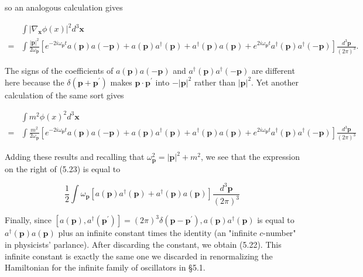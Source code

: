 \documentclass[10pt, letterpaper]{article}
\begin{document}
so an analogous calculation gives

$$
\begin{aligned}
& \int\left|\nabla_{\mathbf{x}} \phi(x)\right|^{2} d^{3} \mathbf{x} \\
= & \int \frac{|\mathbf{p}|^{2}}{2 \omega_{\mathbf{p}}}\left[e^{-2 i \omega_{\mathbf{p}} t} a(\mathbf{p}) a(-\mathbf{p})+a(\mathbf{p}) a^{\dagger}(\mathbf{p})+a^{\dagger}(\mathbf{p}) a(\mathbf{p})+e^{2 i \omega_{\mathbf{p}} t} a^{\dagger}(\mathbf{p}) a^{\dagger}(-\mathbf{p})\right] \frac{d^{3} \mathbf{p}}{(2 \pi)^{3}} .
\end{aligned}
$$

The signs of the coefficients of $a(\mathbf{p}) a(-\mathbf{p})$ and $a^{\dagger}(\mathbf{p}) a^{\dagger}(-\mathbf{p})$ are different here because the $\delta\left(\mathbf{p}+\mathbf{p}^{\prime}\right)$ makes $\mathbf{p} \cdot \mathbf{p}^{\prime}$ into $-|\mathbf{p}|^{2}$ rather than $|\mathbf{p}|^{2}$. Yet another calculation of the same sort gives

$$
\begin{aligned}
& \int m^{2} \phi(x)^{2} d^{3} \mathbf{x} \\
= & \int \frac{m^{2}}{2 \omega_{\mathbf{p}}}\left[e^{-2 i \omega_{\mathbf{p}} t} a(\mathbf{p}) a(-\mathbf{p})+a(\mathbf{p}) a^{\dagger}(\mathbf{p})+a^{\dagger}(\mathbf{p}) a(\mathbf{p})+e^{2 i \omega_{\mathbf{p}} t} a^{\dagger}(\mathbf{p}) a^{\dagger}(-\mathbf{p})\right] \frac{d^{3} \mathbf{p}}{(2 \pi)^{3}}
\end{aligned}
$$

Adding these results and recalling that $\omega_{\mathbf{p}}^{2}=|\mathbf{p}|^{2}+m^{2}$, we see that the expression on the right of (5.23) is equal to

$$
\frac{1}{2} \int \omega_{\mathbf{p}}\left[a(\mathbf{p}) a^{\dagger}(\mathbf{p})+a^{\dagger}(\mathbf{p}) a(\mathbf{p})\right] \frac{d^{3} \mathbf{p}}{(2 \pi)^{3}}
$$

Finally, since $\left[a(\mathbf{p}), a^{\dagger}\left(\mathbf{p}^{\prime}\right)\right]=(2 \pi)^{3} \delta\left(\mathbf{p}-\mathbf{p}^{\prime}\right), a(\mathbf{p}) a^{\dagger}(\mathbf{p})$ is equal to $a^{\dagger}(\mathbf{p}) a(\mathbf{p})$ plus an infinite constant times the identity (an "infinite $c$-number" in physicists' parlance). After discarding the constant, we obtain (5.22). This infinite constant is exactly the same one we discarded in renormalizing the Hamiltonian for the infinite family of oscillators in §5.1.
\end{document}
